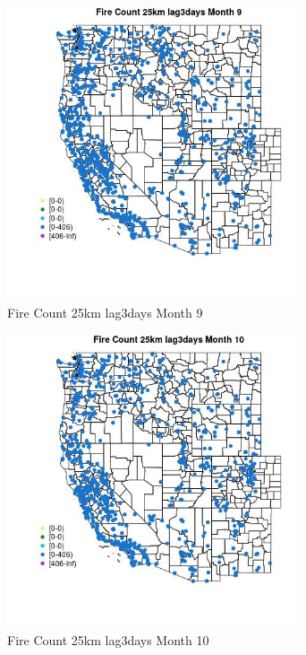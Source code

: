 \begin{figure} 
\centering  
\includegraphics[width=0.77\textwidth]{Code_Outputs/Report_ML_input_PM25_Step4_part_f_de_duplicated_aves_prioritize_24hr_obswNAs_MapObsMo9Fire_Count_25km_lag3days.jpg} 
\caption{\label{fig:Report_ML_input_PM25_Step4_part_f_de_duplicated_aves_prioritize_24hr_obswNAsMapObsMo9Fire_Count_25km_lag3days}Fire Count 25km lag3days Month 9} 
\end{figure} 
 

\begin{figure} 
\centering  
\includegraphics[width=0.77\textwidth]{Code_Outputs/Report_ML_input_PM25_Step4_part_f_de_duplicated_aves_prioritize_24hr_obswNAs_MapObsMo10Fire_Count_25km_lag3days.jpg} 
\caption{\label{fig:Report_ML_input_PM25_Step4_part_f_de_duplicated_aves_prioritize_24hr_obswNAsMapObsMo10Fire_Count_25km_lag3days}Fire Count 25km lag3days Month 10} 
\end{figure} 
 

